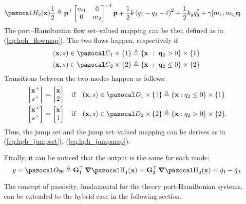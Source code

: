 \begin{exmp}
\begin{align}
        &\Ha_2(\xb) \frac{1}{2}\triangleq \pb^\top\begin{bmatrix}m_1&0\\0&m_2\end{bmatrix}^{-1}\pb + \frac{1}{2}k\left(q_1-q_2-\ell\right)^2 + \frac{1}{2}k_g q_3^2+ \gamma[m_1,m_2]\qb.
    \end{align}
    The port--Hamiltonian flow set--valued mapping can be then defined as in (\ref{eq:hph_flowmap}). The two flows happen, respectively if 
    \begin{align}
        &(\xb,s)\in\C_1\times\{1\}\triangleq\left\{\xb~:~\q_2>0\right\}\times\{1\}\\
        &(\xb,s)\in\C_2\times\{2\}\triangleq\left\{\xb~:~\q_2\leq0\right\}\times\{2\}
    \end{align}
    Transitions between the two modes happen as follows:
    \begin{align}
        &\begin{bmatrix}\xb^+\\s^+\end{bmatrix} = \begin{bmatrix}\xb\\2\end{bmatrix}\quad\text{if}\quad(\xb,s)\in\D_1\times\{1\}\triangleq\{\xb:q_2\leq 0\}\times\{1\}\\
        &\begin{bmatrix}\xb^+\\s^+\end{bmatrix} = \begin{bmatrix}\xb\\1\end{bmatrix}\quad\text{if}\quad(\xb,s)\in\D_2\times\{2\}\triangleq\{\xb:q_2> 0\}\times\{2\}.
    \end{align}
    Thus, the jump set and the jump set--valued mapping can be derives as in (\ref{eq:hph_jumpset}), (\ref{eq:hph_jumpmap}).
    
    Finally, it can be noticed that the output is the same for each mode:
    \begin{equation}
        y = \Oo_{\tt PH}\triangleq\Gb_1^\top\dH_1(\xb) = \Gb_2^\top\dH_2(\xb) = \dot{q}_1 - \dot{q}_2  
    \end{equation}
\end{exmp}
%
%
The concept of passivity, fundamental for the
theory port-Hamiltonian systems, can be extended to
the hybrid case in the following section.
%
\clearpage
%
